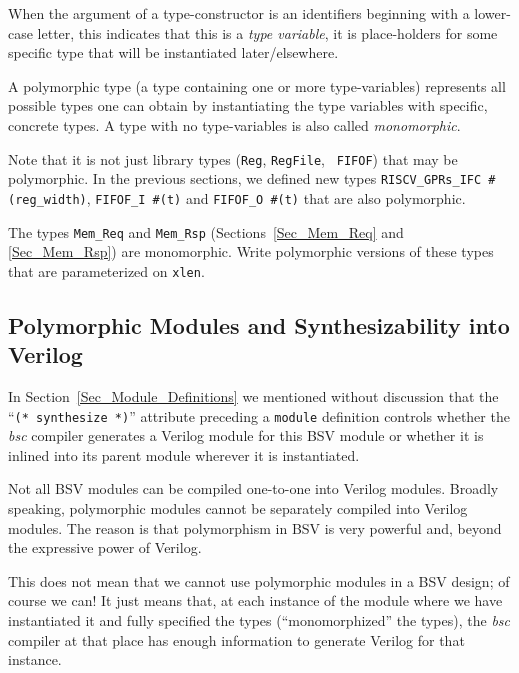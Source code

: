 When the argument of a type-constructor is an identifiers beginning
with a lower-case letter, this indicates that this is a \emph{type
variable}, {\ie} it is place-holders for some specific type that will
be instantiated later/elsewhere.

A polymorphic type (a type containing one or more type-variables)
represents all possible types one can obtain by instantiating the type
variables with specific, concrete types.  A type with no
type-variables is also called \emph{monomorphic}.

Note that it is not just library types ({\tt Reg}, {\tt RegFile}, {\tt
FIFOF}) that may be polymorphic.  In the previous sections, we defined
new types \verb|RISCV_GPRs_IFC #(reg_width)|, \verb|FIFOF_I #(t)| and
\verb|FIFOF_O #(t)| that are also polymorphic.

\hdivider

\Exercise

The types {\tt Mem\_Req} and {\tt Mem\_Rsp}
(Sections~\ref{Sec_Mem_Req} and \ref{Sec_Mem_Rsp}) are monomorphic.
Write polymorphic versions of these types that are parameterized on
{\tt xlen}.

\Endexercise


\subsection{Polymorphic Modules and Synthesizability into Verilog}

\label{Sec_Polymorphic_Types_and_Synthesizability}


In Section~\ref{Sec_Module_Definitions} we mentioned without
discussion that the ``{\tt (* synthesize *)}'' attribute preceding a
{\tt module} definition controls whether the \emph{bsc} compiler
generates a Verilog module for this BSV module or whether it is
inlined into its parent module wherever it is instantiated.

Not all BSV modules can be compiled one-to-one into Verilog modules.
Broadly speaking, polymorphic modules cannot be separately compiled
into Verilog modules.  The reason is that polymorphism in BSV is very
powerful and, beyond the expressive power of Verilog.

This does not mean that we cannot use polymorphic modules in a BSV
design; of course we can!  It just means that, at each instance of the
module where we have instantiated it and fully specified the types
(``monomorphized'' the types), the \emph{bsc} compiler at that place
has enough information to generate Verilog for that instance.

